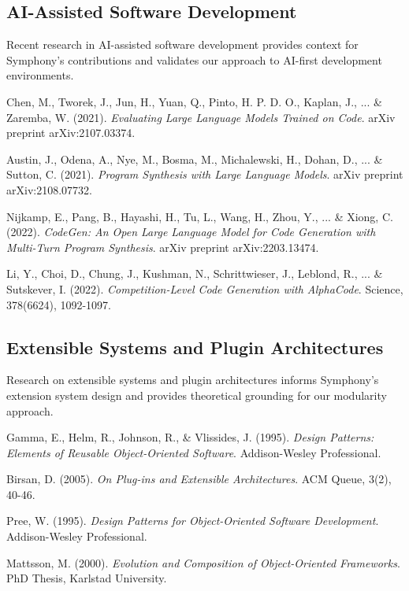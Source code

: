 \subsection*{AI-Assisted Software Development}

Recent research in AI-assisted software development provides context for Symphony's contributions and validates our approach to AI-first development environments.

\begin{compactlist}
    \item Chen, M., Tworek, J., Jun, H., Yuan, Q., Pinto, H. P. D. O., Kaplan, J., ... \& Zaremba, W. (2021). \textit{Evaluating Large Language Models Trained on Code}. arXiv preprint arXiv:2107.03374.
    \item Austin, J., Odena, A., Nye, M., Bosma, M., Michalewski, H., Dohan, D., ... \& Sutton, C. (2021). \textit{Program Synthesis with Large Language Models}. arXiv preprint arXiv:2108.07732.
    \item Nijkamp, E., Pang, B., Hayashi, H., Tu, L., Wang, H., Zhou, Y., ... \& Xiong, C. (2022). \textit{CodeGen: An Open Large Language Model for Code Generation with Multi-Turn Program Synthesis}. arXiv preprint arXiv:2203.13474.
    \item Li, Y., Choi, D., Chung, J., Kushman, N., Schrittwieser, J., Leblond, R., ... \& Sutskever, I. (2022). \textit{Competition-Level Code Generation with AlphaCode}. Science, 378(6624), 1092-1097.
\end{compactlist}

\subsection*{Extensible Systems and Plugin Architectures}

Research on extensible systems and plugin architectures informs Symphony's extension system design and provides theoretical grounding for our modularity approach.

\begin{compactlist}
    \item Gamma, E., Helm, R., Johnson, R., \& Vlissides, J. (1995). \textit{Design Patterns: Elements of Reusable Object-Oriented Software}. Addison-Wesley Professional.
    \item Birsan, D. (2005). \textit{On Plug-ins and Extensible Architectures}. ACM Queue, 3(2), 40-46.
    \item Pree, W. (1995). \textit{Design Patterns for Object-Oriented Software Development}. Addison-Wesley Professional.
    \item Mattsson, M. (2000). \textit{Evolution and Composition of Object-Oriented Frameworks}. PhD Thesis, Karlstad University.
\end{compactlist}
